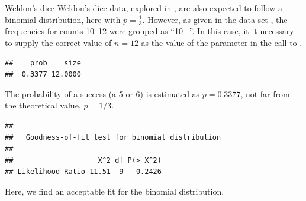 \documentclass[11pt]{book}
\renewenvironment{knitrout}{\small\renewcommand{\baselinestretch}{.85}}{} %
\begin{document}
\begin{Example}[dicefit]{Weldon's dice}
Weldon's dice data, explored in , are also expected to follow
a binomial distribution, here with $p=\frac13$.  However, as given in 
the data set , the frequencies for counts 10--12 were
grouped as ``10+''.
In this case, it it necessary to supply the correct
value of $n=12$ as the value of the  parameter in the call to .
\begin{knitrout}
\color{fgcolor}\begin{kframe}
\begin{alltt}
 \hlstd{=}\hlstd{)}
 \hlkwb{<-}  \hlstd{=}\hlstd{,} \hlstd{=}\hlstd{(}\hlstd{=}\hlstd{))}
\hlopt{$}
\end{alltt}
\begin{verbatim}
##    prob    size 
##  0.3377 12.0000
\end{verbatim}
\end{kframe}
\end{knitrout}
The probability of a success (a 5 or 6) is estimated as $p = 0.3377$,
not far from the theoretical value, $p=1/3$.


\begin{knitrout}
\color{fgcolor}\begin{kframe}
\begin{alltt}
\end{alltt}
\begin{verbatim}
## 
## 	 Goodness-of-fit test for binomial distribution
## 
##                    X^2 df P(> X^2)
## Likelihood Ratio 11.51  9   0.2426
\end{verbatim}
\end{kframe}
\end{knitrout}
Here, we find an acceptable fit for the binomial distribution.
\end{Example}
\end{document}

